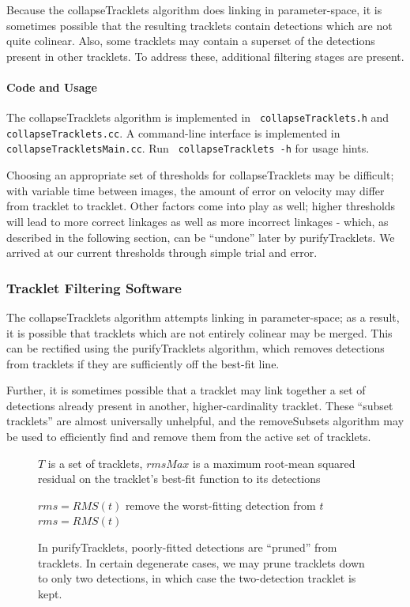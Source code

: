 Because the collapseTracklets algorithm does linking in
parameter-space, it is sometimes possible that the resulting tracklets
contain detections which are not quite colinear.  Also, some tracklets
may contain a superset of the detections present in other tracklets.
To address these, additional filtering stages are present.

\paragraph{Code and Usage}
The collapseTracklets algorithm is implemented in {\tt
  collapseTracklets.h} and {\tt collapseTracklets.cc}.  A command-line
interface is implemented in {\tt collapseTrackletsMain.cc}.  Run {\tt
  collapseTracklets -h} for usage hints.

Choosing an appropriate set of thresholds for collapseTracklets may be
difficult; with variable time between images, the amount of error on
velocity may differ from tracklet to tracklet.  Other factors come
into play as well; higher thresholds will lead to more correct
linkages as well as more incorrect linkages - which, as described in
the following section, can be ``undone'' later by purifyTracklets.  We
arrived at our current thresholds through simple trial and error.

\subsubsection{Tracklet Filtering Software}
The collapseTracklets algorithm attempts linking in parameter-space;
as a result, it is possible that tracklets which are not entirely
colinear may be merged.  This can be rectified using the
purifyTracklets algorithm, which removes detections from tracklets if
they are sufficiently off the best-fit line.  

Further, it is sometimes possible that a tracklet may link together a
set of detections already present in another, higher-cardinality
tracklet.  These ``subset tracklets'' are almost universally
unhelpful, and the removeSubsets algorithm may be used to efficiently
find and remove them from the active set of tracklets.


\begin{figure}[ht!]
\begin{algorithmic}
  \REQUIRE $T$ is a set of tracklets, $rmsMax$ is a maximum root-mean
  squared residual on the tracklet's best-fit function to its
  detections

    \STATE $rms = RMS(t)$
      \STATE remove the worst-fitting detection from $t$
      \STATE $rms = RMS(t)$
    \ENDWHILE
  \ENDFOR
\end{algorithmic}

\caption{In purifyTracklets, poorly-fitted detections are ``pruned''
  from tracklets. In certain degenerate cases, we may prune tracklets
  down to only two detections, in which case the two-detection
  tracklet is kept.}

\label{purifyTrackletsAlgorithm}

\end{figure}


